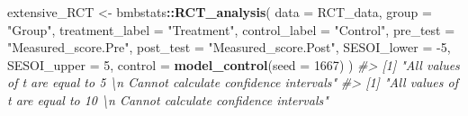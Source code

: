 \documentclass[
]{book}
\newenvironment{Shaded}{\begin{snugshade}}{\end{snugshade}}
\newcommand{\CommentTok}[1]{\textcolor[rgb]{0.56,0.35,0.01}{\textit{#1}}}
\newcommand{\DataTypeTok}[1]{\textcolor[rgb]{0.13,0.29,0.53}{#1}}
\newcommand{\DecValTok}[1]{\textcolor[rgb]{0.00,0.00,0.81}{#1}}
\newcommand{\KeywordTok}[1]{\textcolor[rgb]{0.13,0.29,0.53}{\textbf{#1}}}
\newcommand{\NormalTok}[1]{#1}
\newcommand{\OperatorTok}[1]{\textcolor[rgb]{0.81,0.36,0.00}{\textbf{#1}}}
\newcommand{\StringTok}[1]{\textcolor[rgb]{0.31,0.60,0.02}{#1}}
\begin{document}
\begin{Shaded}
\begin{Highlighting}[]
\NormalTok{extensive\_RCT <{-}}\StringTok{ }\NormalTok{bmbstats}\OperatorTok{::}\KeywordTok{RCT\_analysis}\NormalTok{(}
  \DataTypeTok{data =}\NormalTok{ RCT\_data,}
  \DataTypeTok{group =} \StringTok{"Group"}\NormalTok{,}
  \DataTypeTok{treatment\_label =} \StringTok{"Treatment"}\NormalTok{,}
  \DataTypeTok{control\_label =} \StringTok{"Control"}\NormalTok{,}
  \DataTypeTok{pre\_test =} \StringTok{"Measured\_score.Pre"}\NormalTok{,}
  \DataTypeTok{post\_test =} \StringTok{"Measured\_score.Post"}\NormalTok{,}
  \DataTypeTok{SESOI\_lower =} \DecValTok{{-}5}\NormalTok{,}
  \DataTypeTok{SESOI\_upper =} \DecValTok{5}\NormalTok{,}
  \DataTypeTok{control =} \KeywordTok{model\_control}\NormalTok{(}\DataTypeTok{seed =} \DecValTok{1667}\NormalTok{)}
\NormalTok{)}
\CommentTok{\#> [1] "All values of t are equal to  5 \textbackslash{}n Cannot calculate confidence intervals"}
\CommentTok{\#> [1] "All values of t are equal to  10 \textbackslash{}n Cannot calculate confidence intervals"}



\end{Highlighting}
\end{Shaded}
\end{document}
